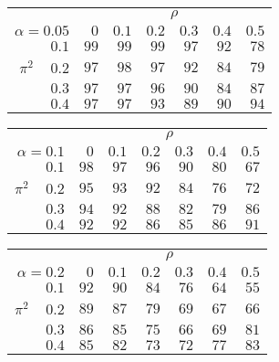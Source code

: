 \begin{tabular}{r|rrrrrr}
\hline\hline
 &\multicolumn{6}{c}{$\rho$} \\ 
 $\alpha = 0.05$ & $0$ & $0.1$ & $0.2$ & $0.3$ & $0.4$ & $0.5$ \\ 
 \hline$0.1$ & $99$ & $99$ & $99$ & $97$ & $92$ & $78$\\ 
$\pi^2\;\;\;$ $0.2$ & $97$ & $98$ & $97$ & $92$ & $84$ & $79$\\ 
$0.3$ & $97$ & $97$ & $96$ & $90$ & $84$ & $87$\\ 
$0.4$ & $97$ & $97$ & $93$ & $89$ & $90$ & $94$\\ 
 \hline 
 \end{tabular}
 
 \vspace{2em} 
 
\begin{tabular}{r|rrrrrr}
\hline\hline
 &\multicolumn{6}{c}{$\rho$} \\ 
 $\alpha = 0.1$ & $0$ & $0.1$ & $0.2$ & $0.3$ & $0.4$ & $0.5$ \\ 
 \hline$0.1$ & $98$ & $97$ & $96$ & $90$ & $80$ & $67$\\ 
$\pi^2\;\;\;$ $0.2$ & $95$ & $93$ & $92$ & $84$ & $76$ & $72$\\ 
$0.3$ & $94$ & $92$ & $88$ & $82$ & $79$ & $86$\\ 
$0.4$ & $92$ & $92$ & $86$ & $85$ & $86$ & $91$\\ 
 \hline 
 \end{tabular}
 
 \vspace{2em} 
 
\begin{tabular}{r|rrrrrr}
\hline\hline
 &\multicolumn{6}{c}{$\rho$} \\ 
 $\alpha = 0.2$ & $0$ & $0.1$ & $0.2$ & $0.3$ & $0.4$ & $0.5$ \\ 
 \hline$0.1$ & $92$ & $90$ & $84$ & $76$ & $64$ & $55$\\ 
$\pi^2\;\;\;$ $0.2$ & $89$ & $87$ & $79$ & $69$ & $67$ & $66$\\ 
$0.3$ & $86$ & $85$ & $75$ & $66$ & $69$ & $81$\\ 
$0.4$ & $85$ & $82$ & $73$ & $72$ & $77$ & $83$\\ 
 \hline 
 \end{tabular}